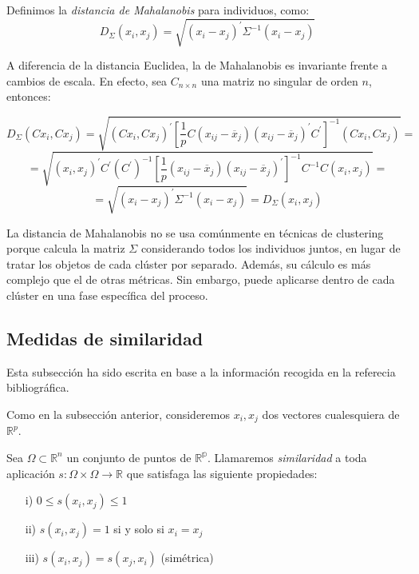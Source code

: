 \begin{definicion}
    Definimos la \textit{distancia de Mahalanobis} para individuos, como:
    \[
    D_{\Sigma}(x_{i},x_{j}) = \sqrt{(x_{i}-x_{j})^{'}\Sigma^{-1}(x_{i}-x_{j})}
    \]
\end{definicion}

A diferencia de la distancia Euclidea, la de Mahalanobis es invariante frente a cambios de escala. En efecto, sea $C_{n\times n}$ una matriz no singular
de orden $n$, entonces:

\[
D_{\Sigma}(Cx_{i},Cx_{j}) = \sqrt{(Cx_{i},Cx_{j})^{'}[\frac{1}{p}C(x_{ij}-\overline{x}_{j})(x_{ij}-\overline{x}_{j})^{'}C^{'}]^{-1}(Cx_{i},Cx_{j})} = 
\]
\[
= \sqrt{(x_{i},x_{j})^{'}C^{'}(C^{'})^{-1}[\frac{1}{p}(x_{ij}-\overline{x}_{j})(x_{ij}-\overline{x}_{j})^{'}]^{-1}C^{-1}C(x_{i},x_{j})} = 
\]    
\[
= \sqrt{(x_{i}-x_{j})^{'}\Sigma^{-1}(x_{i}-x_{j})} = D_{\Sigma}(x_{i},x_{j})
\]

La distancia de Mahalanobis no se usa comúnmente en técnicas de clustering porque calcula la matriz $\Sigma$ considerando todos los individuos juntos, en lugar 
de tratar los objetos de cada clúster por separado. Además, su cálculo es más complejo que el de otras métricas. Sin embargo, puede aplicarse dentro de 
cada clúster en una fase específica del proceso\cite{cluster-mahalanobis}.


\subsection{Medidas de similaridad}

Esta subsección ha sido escrita en base a la información recogida en la referecia bibliográfica\cite{Bib-5}.

Como en la subsección anterior, consideremos $x_{i},x_{j}$ dos vectores cualesquiera de $\mathbb{R}^{p}$. \newline

\begin{definicion}
Sea $\Omega \subset{\mathbb{R}^{n}}$ un conjunto de puntos de $\mathbb{R^{p}}$. Llamaremos \textit{similaridad} a toda aplicación $s:\Omega \times \Omega \rightarrow \mathbb{R}$
que satisfaga las siguiente propiedades:

\begin{itemize}
    \item[i)] $0 \leq s(x_{i},x_{j}) \leq 1$
    \item[ii)]$s(x_{i},x_{j}) = 1$ si y solo si $x_{i} = x_{j}$
    \item[iii)] $s(x_{i},x_{j}) = s(x_{j},x_{i})$ (simétrica)
\end{itemize}
\end{definicion}

